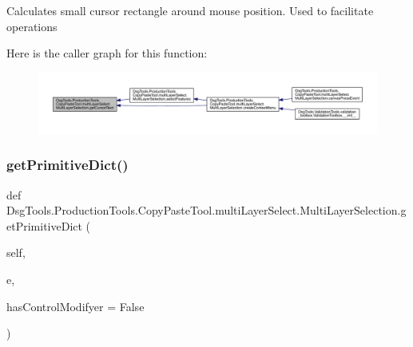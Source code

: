 \begin{DoxyVerb}Calculates small cursor rectangle around mouse position. Used to facilitate operations
\end{DoxyVerb}
 Here is the caller graph for this function\+:
\nopagebreak
\begin{figure}[H]
\begin{center}
\leavevmode
\includegraphics[width=350pt]{class_dsg_tools_1_1_production_tools_1_1_copy_paste_tool_1_1multi_layer_select_1_1_multi_layer_selection_a5be869b251e0c3c15ddfd5b578d1d824_icgraph}
\end{center}
\end{figure}
\mbox{\label{class_dsg_tools_1_1_production_tools_1_1_copy_paste_tool_1_1multi_layer_select_1_1_multi_layer_selection_ae6eafe6bd1b2ee8c71bd043da057be57}} 
\subsubsection{\texorpdfstring{get\+Primitive\+Dict()}{getPrimitiveDict()}}
{\footnotesize\ttfamily def Dsg\+Tools.\+Production\+Tools.\+Copy\+Paste\+Tool.\+multi\+Layer\+Select.\+Multi\+Layer\+Selection.\+get\+Primitive\+Dict (\begin{DoxyParamCaption}\item[{}]{self,  }\item[{}]{e,  }\item[{}]{has\+Control\+Modifyer = {\ttfamily False} }\end{DoxyParamCaption})}


